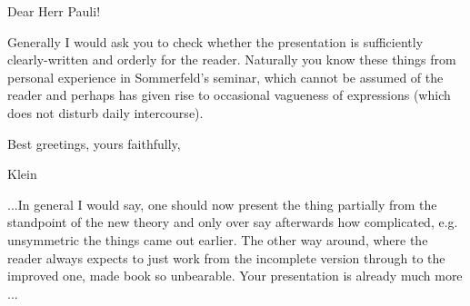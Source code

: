 \begin{letter}{11}
\begin{header}
\date{1921/04/28}

\makeheader

\end{header}

Dear Herr Pauli!

Generally I would ask you to check whether the presentation is sufficiently clearly-written and orderly for the reader. Naturally you know these things from personal experience in Sommerfeld's seminar, which cannot be assumed of the reader and perhaps has given rise to occasional vagueness of expressions (which does not disturb daily intercourse). 


Best greetings, yours faithfully,

Klein

...In general I would say, one should now present the thing partially from the standpoint of the new theory and only over say afterwards how complicated, e.g. unsymmetric the things came out earlier. The other way around, where the reader always expects to just work from the incomplete version through to the improved one, made 
 book so unbearable. Your presentation is already much more ...

\end{letter}